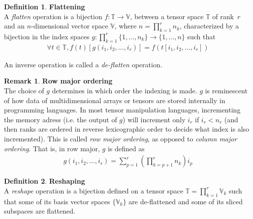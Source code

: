 \documentclass{article}
\theoremstyle{definition}
\newtheorem{definition}{Definition}[section]
\newtheorem{remark}{Remark}
\newcommand{\tspace}{\mathbb{T}}
\newcommand{\vecspace}{\mathbb{V}}
\begin{document}
\begin{definition}\textbf{Flattening}\\
A \emph{flatten} operation is a bijection $f: \tspace \rightarrow \vecspace$, between a tensor space $\tspace$ of rank~$r$ and an $n$-dimensional vector space $\vecspace$, where $n =\displaystyle \prod_{k=1}^r n_k$, characterized by a bijection in the index spaces $g: \displaystyle \prod_{k=1}^r \{1, \ldots, n_k \} \rightarrow\{1, \ldots, n \}$ such that
\begin{gather*}
  \forall t \in \tspace, f(t)[g(i_1, i_2, \ldots, i_r)] = f(t[i_1, i_2, \ldots, i_r])
\end{gather*}

An inverse operation is called a \emph{de-flatten} operation.
\end{definition}

\begin{remark}\textbf{Row major ordering}\\
The choice of $g$ determines in which order the indexing is made. $g$ is reminescent of how data of multidimensional arrays or tensors are stored internally in programming languages. In most tensor manipulation languages, incrementing the memory adress (i.e. the output of $g$) will increment only $i_r$ if $i_r < n_r$ (and then ranks are ordered in reverse lexicographic order to decide what index is also incremented). This is called \emph{row major ordering}, as opposed to \emph{column major ordering}. That is, in row major, $g$ is defined as
\begin{align}
  g(i_1, i_2, \ldots, i_r) = \displaystyle \sum_{p=1}^r \left( \prod_{k=p+1}^r n_k \right) i_p
\end{align}
\end{remark}

\begin{definition}\textbf{Reshaping}\\
A \emph{reshape} operation is a bijection defined on a tensor space $\tspace = \displaystyle \prod_{k=1}^r \vecspace_k$ such that some of its basis vector spaces $\{\vecspace_k\}$ are de-flattened and some of its sliced subspaces are flattened.
\end{definition}
\end{document}
